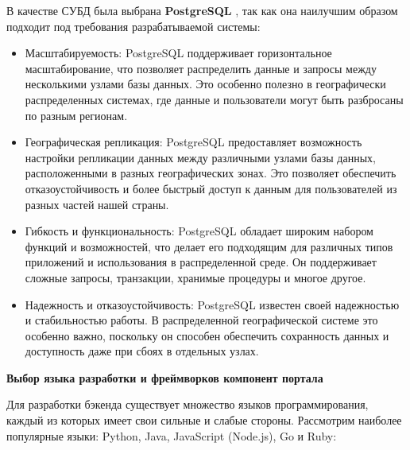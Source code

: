 В качестве СУБД была выбрана \textbf{PostgreSQL} \cite{postgresql}, так как она наилучшим
образом подходит под требования разрабатываемой системы:
\begin{itemize}
	\item Масштабируемость: PostgreSQL поддерживает горизонтальное масштабирование, что позволяет распределить данные и запросы между несколькими узлами базы данных. Это особенно полезно в географически распределенных системах, где данные и пользователи могут быть разбросаны по разным регионам.
	\item Географическая репликация: PostgreSQL предоставляет возможность
настройки репликации данных между различными узлами базы данных, расположенными в разных географических зонах. Это позволяет
обеспечить отказоустойчивость и более быстрый доступ к данным для
пользователей из разных частей нашей страны.
	\item Гибкость и функциональность: PostgreSQL обладает широким набором
функций и возможностей, что делает его подходящим для различных
типов приложений и использования в распределенной среде. Он поддерживает сложные запросы, транзакции, хранимые процедуры и многое
другое.
	\item Надежность и отказоустойчивость: PostgreSQL известен своей надежностью и стабильностью работы. В распределенной географической
системе это особенно важно, поскольку он способен обеспечить сохранность данных и доступность даже при сбоях в отдельных узлах.
\end{itemize}


\textbf{Выбор языка разработки и фреймворков компонент
портала}

Для разработки бэкенда существует множество языков программирования, каждый из которых имеет свои сильные и слабые стороны. Рассмотрим наиболее популярные языки: Python, Java, JavaScript (Node.js), Go и Ruby:

